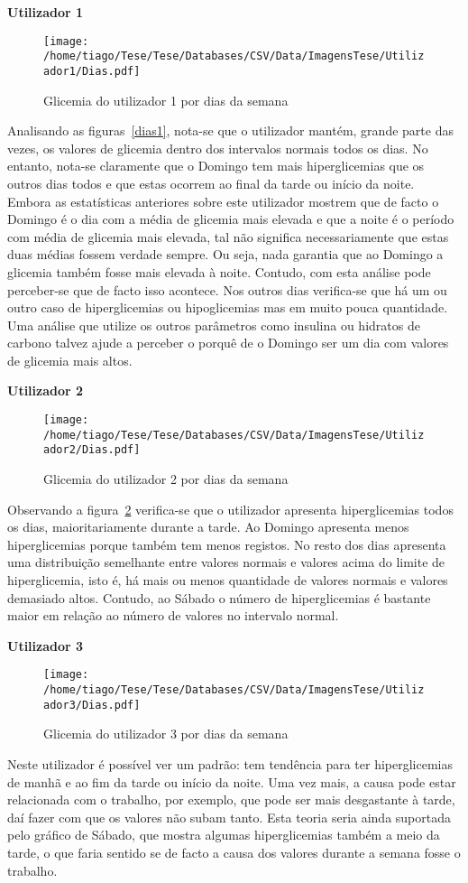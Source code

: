 \textbf{Utilizador 1}

\begin{figure}[H]
\centering
\texttt{[image: /home/tiago/Tese/Tese/Databases/CSV/Data/ImagensTese/Utilizador1/Dias.pdf]}
\caption{Glicemia do utilizador 1 por dias da semana}
\label{fig:dias1}
\end{figure}
Analisando as figuras~\ref{dias1}, nota-se que o utilizador mantém, grande parte das vezes, os valores de glicemia dentro dos intervalos normais todos os dias. No entanto, nota-se claramente que o Domingo tem mais hiperglicemias que os outros dias todos e que estas ocorrem ao final da tarde ou início da noite. Embora as estatísticas anteriores sobre este utilizador mostrem que de facto o Domingo é o dia com a média de glicemia mais elevada e que a noite é o período com média de glicemia mais elevada, tal não significa necessariamente que estas duas médias fossem verdade sempre. Ou seja, nada garantia que ao Domingo a glicemia também fosse mais elevada à noite. Contudo, com esta análise pode perceber-se que de facto isso acontece. Nos outros dias verifica-se que há um ou outro caso de hiperglicemias ou hipoglicemias mas em muito pouca quantidade. Uma análise que utilize os outros parâmetros como insulina ou hidratos de carbono talvez ajude a perceber o porquê de o Domingo ser um dia com valores de glicemia mais altos. 

\textbf{Utilizador 2}


\begin{figure}[H]
\centering
\texttt{[image: /home/tiago/Tese/Tese/Databases/CSV/Data/ImagensTese/Utilizador2/Dias.pdf]}
\caption{Glicemia do utilizador 2 por dias da semana}
\label{fig:dias2}
\end{figure}
Observando a figura~\ref{fig:dias2} verifica-se que o utilizador apresenta hiperglicemias todos os dias, maioritariamente durante a tarde. Ao Domingo apresenta menos hiperglicemias porque também tem menos registos. No resto dos dias apresenta uma distribuição semelhante entre valores normais e valores acima do limite de hiperglicemia, isto é, há mais ou menos quantidade de valores normais e valores demasiado altos. Contudo, ao Sábado o número de hiperglicemias é bastante maior em relação ao número de valores no intervalo normal.



\textbf{Utilizador 3}

\begin{figure}[H]
\centering
\texttt{[image: /home/tiago/Tese/Tese/Databases/CSV/Data/ImagensTese/Utilizador3/Dias.pdf]}
\caption{Glicemia do utilizador 3 por dias da semana}
\label{fig:dias3}
\end{figure}
Neste utilizador é possível ver um padrão: tem tendência para ter hiperglicemias de manhã e ao fim da tarde ou início da noite. Uma vez mais, a causa pode estar relacionada com o trabalho, por exemplo, que pode ser mais desgastante à tarde, daí fazer com que os valores não subam tanto. Esta teoria seria ainda suportada pelo gráfico de Sábado, que mostra algumas hiperglicemias também a meio da tarde, o que faria sentido se de facto a causa dos valores durante a semana fosse o trabalho. 

